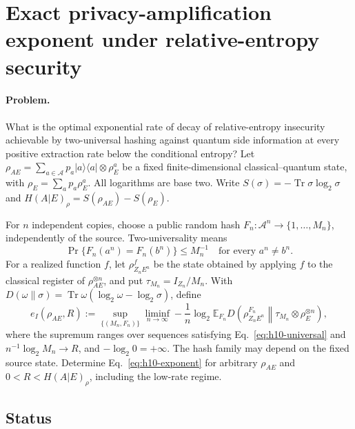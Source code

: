 \section{Exact privacy-amplification exponent under relative-entropy security}
\label{sec:op_58610efec5dbe564}

\paragraph{Problem.}
What is the optimal exponential rate of decay of relative-entropy insecurity achievable by two-universal hashing against quantum side information at every positive extraction rate below the conditional entropy? Let $\rho_{AE}=\sum_{a\in\mathcal A}p_a\lvert a\rangle\langle a\rvert\otimes\rho_E^a$ be a fixed finite-dimensional classical--quantum state, with $\rho_E=\sum_a p_a\rho_E^a$. All logarithms are base two. Write $S(\sigma)=-\operatorname{Tr}\sigma\log_2\sigma$ and $H(A|E)_\rho=S(\rho_{AE})-S(\rho_E)$.

For $n$ independent copies, choose a public random hash $F_n:\mathcal A^n\to\{1,\ldots,M_n\}$, independently of the source. Two-universality means
\begin{equation}
 \Pr\{F_n(a^n)=F_n(b^n)\}\leq M_n^{-1}\quad\text{for every }a^n\neq b^n.
 \label{eq:h10-universal}
\end{equation}
For a realized function $f$, let $\rho^f_{Z_nE^n}$ be the state obtained by applying $f$ to the classical register of $\rho_{AE}^{\otimes n}$, and put $\tau_{M_n}=I_{Z_n}/M_n$. With $D(\omega\|\sigma)=\operatorname{Tr}\omega(\log_2\omega-\log_2\sigma)$, define
\begin{equation}
 e_I(\rho_{AE},R):=\sup_{\{(M_n,F_n)\}}\liminf_{n\to\infty}-\frac1n\log_2\mathbb E_{F_n}D\!\left(\rho^{F_n}_{Z_nE^n}\middle\|\tau_{M_n}\otimes\rho_E^{\otimes n}\right),
 \label{eq:h10-exponent}
\end{equation}
where the supremum ranges over sequences satisfying Eq.~\eqref{eq:h10-universal} and $n^{-1}\log_2 M_n\to R$, and $-\log_2 0=+\infty$. The hash family may depend on the fixed source state. Determine Eq.~\eqref{eq:h10-exponent} for arbitrary $\rho_{AE}$ and $0<R<H(A|E)_\rho$, including the low-rate regime.

\subsection*{Status}

